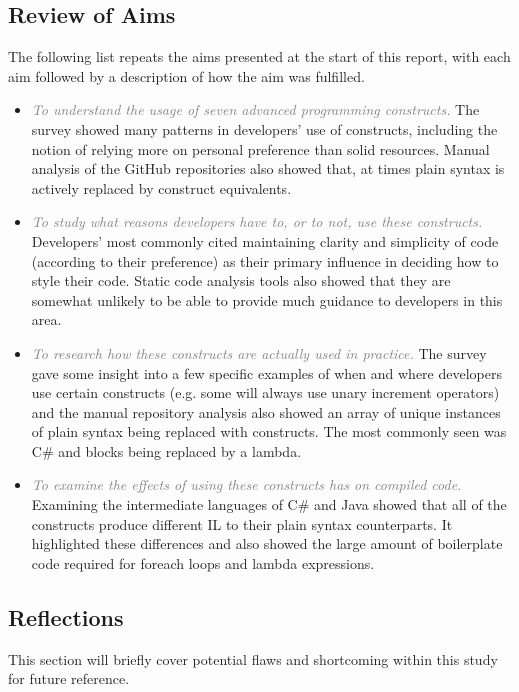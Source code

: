 \documentclass{article}
\begin{document}
    \subsection{Review of Aims}
        The following list repeats the aims presented at the start of this report, with each aim followed by a description of how the aim was fulfilled.
        \begin{itemize}
            \item \textcolor{gray}{\textit{To understand the usage of seven advanced programming constructs.}}
                The survey showed many patterns in developers' use of constructs, including the notion of relying more on personal preference than solid resources. Manual analysis of the GitHub repositories also showed that, at times plain syntax is actively replaced by construct equivalents.
            \item \textcolor{gray}{\textit{To study what reasons developers have to, or to not, use these constructs.}}
                Developers' most commonly cited maintaining clarity and simplicity of code (according to their preference) as their primary influence in deciding how to style their code. Static code analysis tools also showed that they are somewhat unlikely to be able to provide much guidance to developers in this area.
            \item \textcolor{gray}{\textit{To research how these constructs are actually used in practice.}}
                The survey gave some insight into a few specific examples of when and where developers use certain constructs (e.g. some will always use unary increment operators) and the manual repository analysis also showed an array of unique instances of plain syntax being replaced with constructs. The most commonly seen was C\#  and  blocks being replaced by a lambda.
            \item \textcolor{gray}{\textit{To examine the effects of using these constructs has on compiled code.}}
                Examining the intermediate languages of C\# and Java showed that all of the constructs produce different IL to their plain syntax counterparts. It highlighted these differences and also showed the large amount of boilerplate code required for foreach loops and lambda expressions.
        \end{itemize}

    \subsection{Reflections}
        This section will briefly cover potential flaws and shortcoming within this study for future reference.
\end{document}
